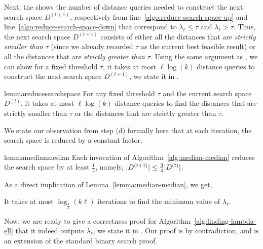 Next, the  shows the number of distance queries needed to construct the next search space $D^{(t+1)}$, respectively from line~\ref{algo:reduce-search-space-up} and line~\ref{algo:reduce-search-space-down} that correspond to $\lambda_{\ell} \leq \tau$ and $\lambda_{\ell} > \tau$.
Thus, the next search space $D^{(t+1)}$ consists of either all the distances that are \emph{strictly smaller than $\tau$} (since we already recorded $\tau$ as the current best feasible result) or all the distances that are \emph{strictly greater than $\tau$}. 
Using the same argument as , we can show for a fixed threshold $\tau$, it takes at most $\ell \log(k)$ distance queries to construct the next search space $D^{(t+1)}$, we state it in . 
\begin{restatable}{lemma}{reducesearchspace}
    \label{lemma:reduce-search-space}
    For any fixed threshold $\tau$ and the current search space $D^{(t)}$, it takes at most $\ell \log(k)$ distance queries to find the distances that are strictly smaller than $\tau$ or the distances that are strictly greater than $\tau$.
\end{restatable}






We state our observation from step (d) formally here that at each iteration, the search space is reduced by a constant factor. 

\begin{restatable}{lemma}{medianmedian}
    \label{lemma:median-median}
    Each invocation of Algorithm~\ref{alg:median-median} reduces the search space by at least $\frac{1}{4}$, namely, $\lvert D^{(t+1)} \rvert  \leq \frac{3}{4} \lvert D^{(t)} \rvert $.
\end{restatable}



As a direct implication of Lemma~\ref{lemma:median-median}, we get,
\begin{corollary}
    It takes at most $\log_{\frac{4}{3}}(k \ell)$ iterations to find the minimum value of $\lambda_{\ell}$.
\end{corollary}

Now, we are ready to give a correctness proof for Algorithm~\ref{alg:finding-lambda-ell} that it indeed outputs $\lambda_{\ell}$, we state it in . 
Our proof is by contradiction, and is an extension of the standard binary search proof. 

